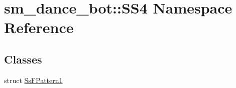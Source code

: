 \hypertarget{namespacesm__dance__bot_1_1SS4}{}\section{sm\+\_\+dance\+\_\+bot\+:\+:S\+S4 Namespace Reference}
\label{namespacesm__dance__bot_1_1SS4}
\subsection*{Classes}
\begin{DoxyCompactItemize}
\item 
struct \hyperlink{structsm__dance__bot_1_1SS4_1_1SsFPattern1}{Ss\+F\+Pattern1}
\end{DoxyCompactItemize}

